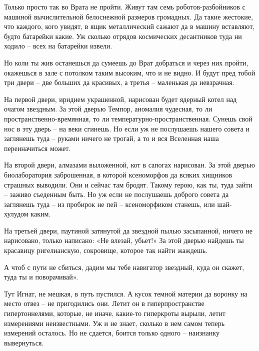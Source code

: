 \documentclass[ebook,oneside,final,openright]{memoir}
\begin{document}
\par
Только просто так во Врата не пройти. Живут там семь роботов-разбойников с машиной вычислительной белоснежной размеров громадных. Да такие жестокие, что каждого, кого увидят, в ящик металлический сажают да в машину вставляют, будто батарейки какие. Уж сколько отрядов космических десантников туда ни ходило – всех на батарейки извели.\par
\par
Но коли ты жив останешься да сумеешь до Врат добраться и через них пройти, окажешься в зале с потолком таким высоким, что и не видно. И будут пред тобой три двери – две больших да красивых, а третья – маленькая да невзрачная.\par
\par
На первой двери, иридием украшенной, нарисован будет ядерный котел над очагом звездным. За этой дверью Темпор, аномалия чудесная, то ли пространственно-времянная, то ли температурно-пространственная. Сунешь свой нос в эту дверь – на веки сгинешь. Но если уж не послушаешь нашего совета и заглянешь туда – руками ничего не трогай, а то и вся Вселенная наша переиначиться может.\par
\par
На второй двери, алмазами выложенной, кот в сапогах нарисован. За этой дверью биолаборатория заброшенная, в которой ксеноморфов да всяких хищников страшных выводили. Они и сейчас там бродят. Такому герою, как ты, туда зайти – заживо съеденным быть. Но уж если не послушаешь доброго совета да заглянешь туда – из пробирок не пей – ксеноморфиком станешь, или шай-хулудом каким.\par
\par
На третьей двери, паутиной затянутой да звездной пылью засыпанной, ничего не нарисовано, только написано: «Не влезай, убьет!» За этой дверью найдешь ты красавицу ригелианскую, сокровище, которое так найти жаждешь.\par
\par
А чтоб с пути не сбиться, дадим мы тебе навигатор звездный, куда он скажет, туда ты и поворачивай».\par
\par
Тут Игнат, не мешкая, в путь пустился. А кусок темной материи да воронку на место отвез – не пригодились они. Летит он в гиперпространстве гипертоннелями, которые, не иначе, какие-то гиперкроты вырыли, летит измерениями неизвестными. Уж и не знает, сколько в нем самом теперь измерений осталось. Но не сдается, боится только одного – наизнанку вывернуться.\par
\end{document}
